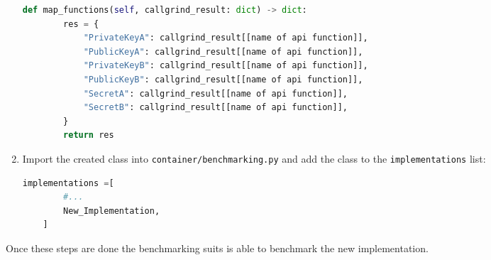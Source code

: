 \begin{enumerate}
\begin{lstlisting}[language=Python]
    def map_functions(self, callgrind_result: dict) -> dict:
        res = {
            "PrivateKeyA": callgrind_result[[name of api function]],
            "PublicKeyA": callgrind_result[[name of api function]],
            "PrivateKeyB": callgrind_result[[name of api function]],
            "PublicKeyB": callgrind_result[[name of api function]],
            "SecretA": callgrind_result[[name of api function]],
            "SecretB": callgrind_result[[name of api function]],
        }
        return res
\end{lstlisting}
\item Import the created class into \texttt{container/benchmarking.py} and add the class to the \texttt{implementations} list:
\begin{lstlisting}[language=Python]
implementations =[
        #...
        New_Implementation,
    ]
\end{lstlisting}
\end{enumerate}
Once these steps are done the benchmarking suits is able to benchmark the new implementation.

